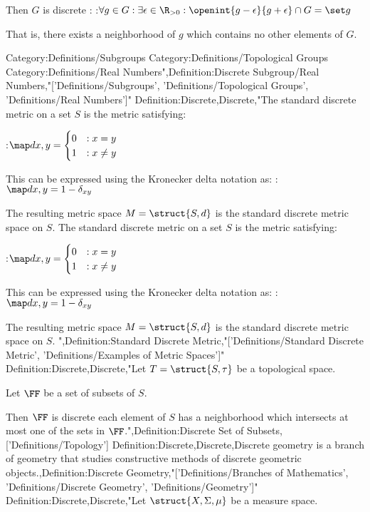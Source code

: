 Then $G$ is discrete :
:$\forall g \in G: \exists \epsilon \in \R_{>0}: \openint {g - \epsilon} {g + \epsilon} \cap G = \set g$

That is, there exists a neighborhood of $g$ which contains no other elements of $G$.


Category:Definitions/Subgroups
Category:Definitions/Topological Groups
Category:Definitions/Real Numbers",Definition:Discrete Subgroup/Real Numbers,"['Definitions/Subgroups', 'Definitions/Topological Groups', 'Definitions/Real Numbers']"
Definition:Discrete,Discrete,"The standard discrete metric on a set $S$ is the metric satisfying:

:$\map d {x, y} = \begin {cases} 0 & : x = y \\ 1 & : x \ne y \end {cases}$


This can be expressed using the Kronecker delta notation as:
:$\map d {x, y} = 1 - \delta_{x y}$


The resulting metric space $M = \struct {S, d}$ is the standard discrete metric space on $S$.
The standard discrete metric on a set $S$ is the metric satisfying:

:$\map d {x, y} = \begin {cases} 0 & : x = y \\ 1 & : x \ne y \end {cases}$


This can be expressed using the Kronecker delta notation as:
:$\map d {x, y} = 1 - \delta_{x y}$


The resulting metric space $M = \struct {S, d}$ is the standard discrete metric space on $S$.
",Definition:Standard Discrete Metric,"['Definitions/Standard Discrete Metric', 'Definitions/Examples of Metric Spaces']"
Definition:Discrete,Discrete,"Let $T = \struct {S, \tau}$ be a topological space.

Let $\FF$ be a set of subsets of $S$.


Then $\FF$ is discrete  each element of $S$ has a neighborhood which intersects at most one of the sets in $\FF$.",Definition:Discrete Set of Subsets,['Definitions/Topology']
Definition:Discrete,Discrete,Discrete geometry is a branch of geometry that studies constructive methods of discrete geometric objects.,Definition:Discrete Geometry,"['Definitions/Branches of Mathematics', 'Definitions/Discrete Geometry', 'Definitions/Geometry']"
Definition:Discrete,Discrete,"Let $\struct {X, \Sigma, \mu}$ be a measure space.



